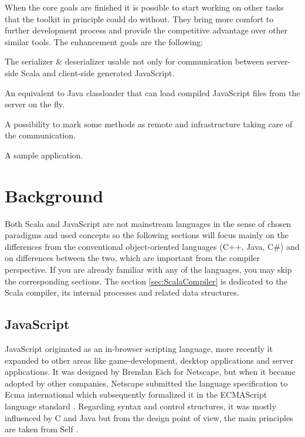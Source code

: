 \documentclass[12pt,a4paper]{report}
\begin{document}
When the core goals are finished it is possible to start working on other tasks that the toolkit in principle could do without. They bring more comfort to further development process and provide the competitive advantage over other similar tools. The enhancement goals are the following:

\begin{description}[style=multiline,leftmargin=5cm]
\item[7 - Serialization] The serializer \& deserializer usable not only for communication between server-side Scala and client-side generated JavaScript.
\item[8 - Loading] An equivalent to Java classloader that can load compiled JavaScript files from the server on the fly.
\item[9 - RPC] A possibility to mark some methods as remote and infrastructure taking care of the communication.
\item[10 - Application] A sample application.
\end{description}



\chapter{Background}

Both Scala and JavaScript are not mainstream languages in the sense of chosen paradigms and used concepts so the following sections will focus mainly on the differences from the conventional object-oriented languages (C++, Java, C\#) and on differences between the two, which are important from the compiler perspective. If you are already familiar with any of the languages, you may skip the corresponding sections. The section \ref{sec:ScalaCompiler} is dedicated to the Scala compiler, its internal processes and related data structures.

\section{JavaScript}

JavaScript \cite{JavaScript} originated as an in-browser scripting language, more recently it expanded to other areas like game-development, desktop applications and server applications. It was designed by Brendan Eich for Netscape, but when it became adopted by other companies, Netscape submitted the language specification to Ecma international \cite{Ecma} which subsequently formalized it in the ECMAScript language standard \cite{EcmaScript}. Regarding syntax and control structures, it was mostly influenced by C and Java but from the design point of view, the main principles are taken from Self \cite{Self}.
\end{document}
